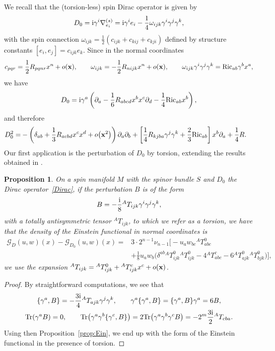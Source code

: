 \documentclass[pdftex]{sigma}
\numberwithin{equation}{section}
\newtheorem{Proposition}[Theorem]{Proposition}
\theoremstyle{definition}
\def\Tr{\mathrm{Tr}}
\begin{document}
We recall that the (torsion-less) spin Dirac operator is given by
\[
D_0={\rm i} \gamma^i\nabla_{e_i}^{(s)}={\rm i}\gamma^i e_i -\frac{1}{4}\omega_{ijk}\gamma^i\gamma^j\gamma^k,
\]
with the spin connection $\omega_{ijk}=\frac{1}{2}(c_{ijk}+c_{kij}+c_{kji})$ defined by structure constants $[e_i,e_j]=c_{ijk}e_k$. Since in the normal coordinates
\[
c_{pqr}=\frac{1}{2}R_{pqnr}x^n +o({\bf x}), \qquad
\omega_{ijk}=-\frac{1}{2}R_{nijk}x^n +o({\bf x}), \qquad
\omega_{ijk}\gamma^i\gamma^j\gamma^k
=\mathrm{Ric}_{ab}\gamma^b x^a,
\]
we have
\begin{equation}
	D_0={\rm i}\gamma^a\left(\partial_a - \frac{1}{6}R_{abcd}x^b x^c \partial_d-\frac{1}{4}\mathrm{Ric}_{ab} x^b\right),
	\label{Dirac}
\end{equation}
and therefore
\begin{align*}
D_0^2
=&-\left(\delta_{ab}+\frac{1}{3}R_{acbd}x^c x^d +o\bigl({\bf x}^2\bigr)\right)\partial_a\partial_b+\left[\frac{1}{4}R_{kjba}\gamma^j\gamma^k +\frac{2}{3}\mathrm{Ric}_{ab}\right]x^b \partial_a + \frac{1}{4}R.
\end{align*}
Our first application is the perturbation of $D_0$ by torsion, extending the results obtained in \cite{dabrowski2024}.
\begin{Proposition}
\label{example:t}
On a spin manifold $M$ with the spinor bundle $S$ and $D_0$ the Dirac operator~{\rm\eqref{Dirac}}, if the perturbation
$B$ is of the form
\begin{equation}
\label{eq:B}
B=-\frac{\rm i}{8}{}^AT_{ijk}\gamma^i\gamma^j\gamma^k,
\end{equation}
with a totally antisymmetric tensor ${}^AT_{ijk}$, to which we refer as a torsion, we have that the density of the Einstein functional in normal coordinates is
\begin{align*}%
\mathscr{G}_D(u,w)(x)-\mathscr{G}_{D_0}(u,w)(x)
		={} &3 \cdot 2^{n-1} \nu_{n-1}\biggl[-u_aw_{bc}{}^AT^{0}_{abc} \\
			& +\frac{1}{8}u_aw_b\bigl(\delta^{ab}{}^AT^{0}_{ijk}{}^AT^{0}_{ijk}-4{}^AT^{c}_{abc}-6 {}^AT^{0}_{ajk}{}^AT^{0}_{bjk}\bigr)\biggr],
		\end{align*}
 we use the expansion ${}^AT_{ijk}={}^AT^{0}_{ijk}+{}^AT^{c}_{ijk}x^c +o({\bf x})$.
\end{Proposition}
\begin{proof}
By straightforward computations, we see that
	\begin{gather}
			\{\gamma^a, B\}=-\frac{3{\rm i}}{4}{}^AT_{ajk}\gamma^j\gamma^k, \qquad \gamma^a\{\gamma^a,B\}=\{\gamma^a, B\}\gamma^a=6B,\nonumber\\
			\Tr(\gamma^a B)=0, \qquad \Tr\bigl(\gamma^a\gamma^b\{\gamma^c, B\}\bigr)=2 \Tr\bigl(\gamma^a \gamma^b\gamma^c B\bigr)=-2^{m} \frac{3{\rm i}}{2}{}^AT_{cba}.\label{eq:slady_B_spinowe}
	\end{gather}
Using then Proposition~\ref{prop:Ein}, we end up with the form of the Einstein functional in the presence of torsion.
\end{proof}
\end{document}
